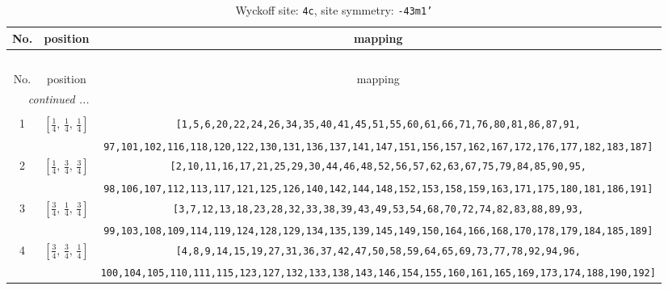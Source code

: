 \documentclass[fleqn,8pt]{jsarticle}
\begin{document}
\begin{longtable}{ccc}
\caption{Wyckoff site: {\tt 4c}, site symmetry: {\tt -43m1'}}
 \\
 \hline \hline
No. & position & mapping \\ \hline \endfirsthead

\multicolumn{2}{l}{\tablename\ \thetable{}} \\
 \hline \hline
No. & position & mapping \\ \hline \endhead

 \hline \hline
\multicolumn{2}{r}{\footnotesize\it continued ...} \\ \endfoot

 \hline \hline
\multicolumn{2}{r}{} \\ \endlastfoot

1 & $\left[ \frac{1}{4},\, \frac{1}{4},\, \frac{1}{4} \right]$ & {\tt [1,5,6,20,22,24,26,34,35,40,41,45,51,55,60,61,66,71,76,80,81,86,87,91,} \\ \hline
 &  & {\tt 97,101,102,116,118,120,122,130,131,136,137,141,147,151,156,157,162,167,172,176,177,182,183,187]} \\ \hline
2 & $\left[ \frac{1}{4},\, \frac{3}{4},\, \frac{3}{4} \right]$ & {\tt [2,10,11,16,17,21,25,29,30,44,46,48,52,56,57,62,63,67,75,79,84,85,90,95,} \\ \hline
 &  & {\tt 98,106,107,112,113,117,121,125,126,140,142,144,148,152,153,158,159,163,171,175,180,181,186,191]} \\ \hline
3 & $\left[ \frac{3}{4},\, \frac{1}{4},\, \frac{3}{4} \right]$ & {\tt [3,7,12,13,18,23,28,32,33,38,39,43,49,53,54,68,70,72,74,82,83,88,89,93,} \\ \hline
 &  & {\tt 99,103,108,109,114,119,124,128,129,134,135,139,145,149,150,164,166,168,170,178,179,184,185,189]} \\ \hline
4 & $\left[ \frac{3}{4},\, \frac{3}{4},\, \frac{1}{4} \right]$ & {\tt [4,8,9,14,15,19,27,31,36,37,42,47,50,58,59,64,65,69,73,77,78,92,94,96,} \\ \hline
 &  & {\tt 100,104,105,110,111,115,123,127,132,133,138,143,146,154,155,160,161,165,169,173,174,188,190,192]} \\
\end{longtable}
\renewcommand{\arraystretch}{1.2}
\end{document}

